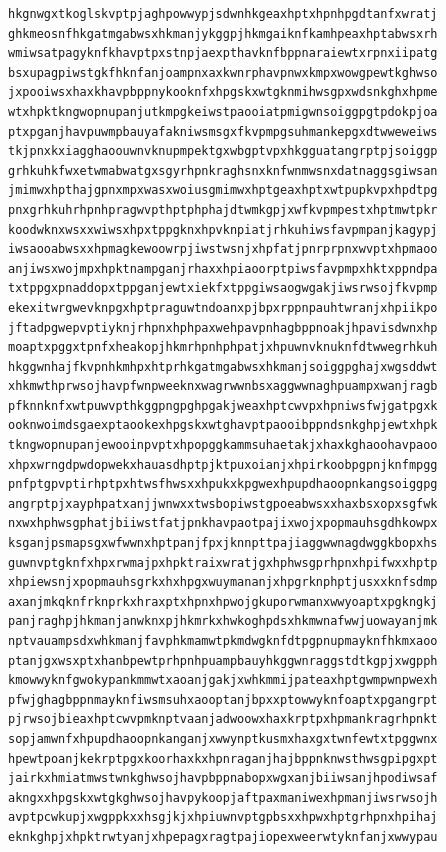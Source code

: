 \documentclass[11pt,letterpaper]{exam}
\begin{document}
\begin{questions}
\begin{verbatim}
hkgnwgxtkoglskvptpjaghpowwypjsdwnhkgeaxhptxhpnhpgdtanfxwratj
ghkmeosnfhkgatmgabwsxhkmanjykggpjhkmgaiknfkamhpeaxhptabwsxrh
wmiwsatpagyknfkhavptpxstnpjaexpthavknfbppnaraiewtxrpnxiipatg
bsxupagpiwstgkfhknfanjoampnxaxkwnrphavpnwxkmpxwowgpewtkghwso
jxpooiwsxhaxkhavpbppnykooknfxhpgskxwtgknmihwsgpxwdsnkghxhpme
wtxhpktkngwopnupanjutkmpgkeiwstpaooiatpmigwnsoiggpgtpdokpjoa
ptxpganjhavpuwmpbauyafakniwsmsgxfkvpmpgsuhmankepgxdtwweweiws
tkjpnxkxiagghaoouwnvknupmpektgxwbgptvpxhkgguatangrptpjsoiggp
grhkuhkfwxetwmabwatgxsgyrhpnkraghsnxknfwnmwsnxdatnaggsgiwsan
jmimwxhpthajgpnxmpxwasxwoiusgmimwxhptgeaxhptxwtpupkvpxhpdtpg
pnxgrhkuhrhpnhpragwvpthptphphajdtwmkgpjxwfkvpmpestxhptmwtpkr
koodwknxwsxxwiwsxhpxtppgknxhpvknpiatjrhkuhiwsfavpmpanjkagypj
iwsaooabwsxxhpmagkewoowrpjiwstwsnjxhpfatjpnrprpnxwvptxhpmaoo
anjiwsxwojmpxhpktnampganjrhaxxhpiaoorptpiwsfavpmpxhktxppndpa
txtppgxpnaddopxtppganjewtxiekfxtppgiwsaogwgakjiwsrwsojfkvpmp
ekexitwrgwevknpgxhptpraguwtndoanxpjbpxrppnpauhtwranjxhpiikpo
jftadpgwepvptiyknjrhpnxhphpaxwehpavpnhagbppnoakjhpavisdwnxhp
moaptxpggxtpnfxheakopjhkmrhpnhphpatjxhpuwnvknuknfdtwwegrhkuh
hkggwnhajfkvpnhkmhpxhtprhkgatmgabwsxhkmanjsoiggpghajxwgsddwt
xhkmwthprwsojhavpfwnpweeknxwagrwwnbsxaggwwnaghpuampxwanjragb
pfknnknfxwtpuwvpthkggpngpghpgakjweaxhptcwvpxhpniwsfwjgatpgxk
ooknwoimdsgaexptaookexhpgskxwtghavptpaooibppndsnkghpjewtxhpk
tkngwopnupanjewooinpvptxhpopggkammsuhaetakjxhaxkghaoohavpaoo
xhpxwrngdpwdopwekxhauasdhptpjktpuxoianjxhpirkoobpgpnjknfmpgg
pnfptgpvptirhptpxhtwsfhwsxxhpukxkpgwexhpupdhaoopnkangsoiggpg
angrptpjxayphpatxanjjwnwxxtwsbopiwstgpoeabwsxxhaxbsxopxsgfwk
nxwxhphwsgphatjbiiwstfatjpnkhavpaotpajixwojxpopmauhsgdhkowpx
ksganjpsmapsgxwfwwnxhptpanjfpxjknnpttpajiaggwwnagdwggkbopxhs
guwnvptgknfxhpxrwmajpxhpktraixwratjgxhphwsgprhpnxhpifwxxhptp
xhpiewsnjxpopmauhsgrkxhxhpgxwuymananjxhpgrknphptjusxxknfsdmp
axanjmkqknfrknprkxhraxptxhpnxhpwojgkuporwmanxwwyoaptxpgkngkj
panjraghpjhkmanjanwknxpjhkmrkxhwkoghpdsxhkmwnafwwjuowayanjmk
nptvauampsdxwhkmanjfavphkmamwtpkmdwgknfdtpgpnupmayknfhkmxaoo
ptanjgxwsxptxhanbpewtprhpnhpuampbauyhkggwnraggstdtkgpjxwgpph
kmowwyknfgwokypankmmwtxaoanjgakjxwhkmmijpateaxhptgwmpwnpwexh
pfwjghagbppnmayknfiwsmsuhxaooptanjbpxxptowwyknfoaptxpgangrpt
pjrwsojbieaxhptcwvpmknptvaanjadwoowxhaxkrptpxhpmankragrhpnkt
sopjamwnfxhpupdhaoopnkanganjxwwynptkusmxhaxgxtwnfewtxtpggwnx
hpewtpoanjkekrptpgxkoorhaxkxhpnraganjhajbppnknwsthwsgpipgxpt
jairkxhmiatmwstwnkghwsojhavpbppnabopxwgxanjbiiwsanjhpodiwsaf
akngxxhpgskxwtgkghwsojhavpykoopjaftpaxmaniwexhpmanjiwsrwsojh
avptpcwkupjxwgppkxxhsgjkjxhpiuwnvptgpbsxxhpwxhptgrhpnxhpihaj
eknkghpjxhpktrwtyanjxhpepagxragtpajiopexweerwtyknfanjxwwypau

\end{verbatim}
\end{questions}
\end{document}
